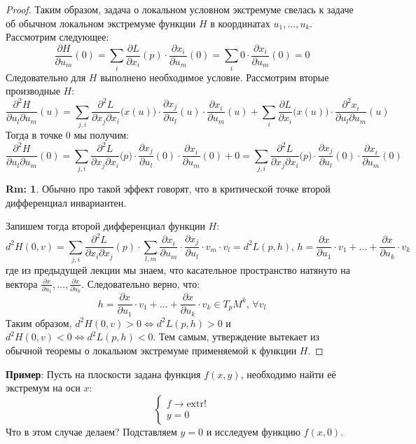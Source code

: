 \documentclass[12pt]{article}
\theoremstyle{definition}
\newtheorem{rem}{Rm:}
\begin{document}
\begin{proof}
	Таким образом, задача о локальном условном экстремуме свелась к задаче об обычном локальном экстремуме функции $H$ в координатах $u_1, \dotsc, u_k$. Рассмотрим следующее:
	$$
		\dfrac{\partial H}{\partial u_m}(0) = \sum\limits_{i} \dfrac{\partial L}{\partial x_i}(p){\cdot}\dfrac{\partial x_i}{\partial u_m}(0)  = \sum\limits_{i} 0 {\cdot}\dfrac{\partial x_i}{\partial u_m}(0) = 0
	$$
	Следовательно для $H$ выполнено необходимое условие. Рассмотрим вторые производные $H$:
	$$
		\dfrac{\partial^2 H}{\partial u_l \partial u_m}(u) = \sum\limits_{j,i}\dfrac{\partial^2 L}{\partial x_j \partial x_i}\big(x(u)\big){\cdot}\dfrac{\partial x_j}{\partial u_l}(u){\cdot}\dfrac{\partial x_i}{\partial u_m}(u) + \sum\limits_{i} \dfrac{\partial L}{\partial x_i}\big(x(u)\big){\cdot}\dfrac{\partial^2 x_i}{\partial u_l \partial u_m}(u)
	$$
	Тогда в точке $0$ мы получим:
	$$
		\dfrac{\partial^2 H}{\partial u_l \partial u_m}(0) = \sum\limits_{j,i}\dfrac{\partial^2 L}{\partial x_j \partial x_i}\big(p\big){\cdot}\dfrac{\partial x_j}{\partial u_l}(0){\cdot}\dfrac{\partial x_i}{\partial u_m}(0) + 0 = \sum\limits_{j,i}\dfrac{\partial^2 L}{\partial x_j \partial x_i}\big(p\big){\cdot}\dfrac{\partial x_j}{\partial u_l}(0){\cdot}\dfrac{\partial x_i}{\partial u_m}(0)
	$$
	\begin{rem}
		Обычно про такой эффект говорят, что в критической точке второй дифференциал инвариантен.
	\end{rem}
	Запишем тогда второй дифференциал функции $H$:
	$$
		d^2 H(0,v) = \sum\limits_{j,i}\dfrac{\partial^2 L}{\partial x_i \partial x_j}(p){\cdot}\sum\limits_{l,m}\dfrac{\partial x_i}{\partial u_m}{\cdot}\dfrac{\partial x_j}{\partial u_l}{\cdot}v_m{\cdot}v_l = d^2L(p,h), \, h = \dfrac{\partial x}{\partial u_1}{\cdot}v_1 + \dotsc + \dfrac{\partial x}{\partial u_k}{\cdot}v_k
	$$
	где из предыдущей лекции мы знаем, что касательное пространство натянуто на вектора $\tfrac{\partial x}{\partial u_1}, \dotsc, \tfrac{\partial x}{\partial u_k}$. Следовательно верно, что: 
	$$
		h = \dfrac{\partial x}{\partial u_1}{\cdot}v_1 + \dotsc + \dfrac{\partial x}{\partial u_k}{\cdot}v_k \in T_p M^k, \, \forall v_l
	$$
	Таким образом, $d^2H(0,v) > 0 \Leftrightarrow d^2L(p,h) > 0$ и $d^2H(0,v) < 0 \Leftrightarrow d^2L(p,h) < 0$. Тем самым, утверждение вытекает из обычной теоремы о локальном экстремуме применяемой к функции $H$.
\end{proof}

\textbf{Пример}: Пусть на плоскости задана функция $f(x,y)$, необходимо найти её экстремум на оси $x$:
$$
	\left\{
	\begin{array}{l}
		f \to \text{extr}!\\
		y = 0
	\end{array}
	\right.
$$
Что в этом случае делаем? Подставляем $y=0$ и исследуем функцию $f(x,0)$.
\end{document}
